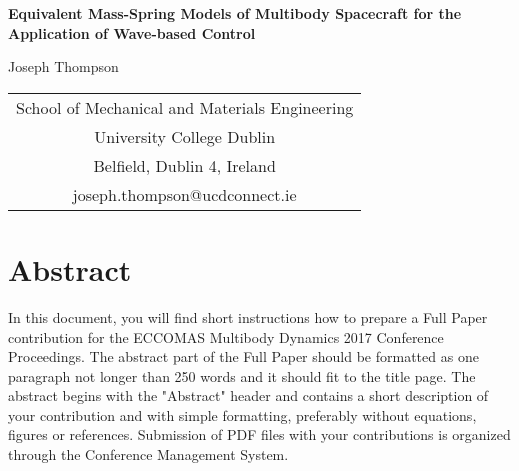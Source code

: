 \documentclass{mbd_fullpaper}
\begin{document}
\newcommand{\heading}[1]{
   {\medskip\hskip5em\bf\large{#1}
   \vskip0.5ex
   }
}
\newcommand{\eqnref}[1]{
  (\ref{#1})
}

\renewcommand{\refname}{\medskip\bf\large References}



\begin{center}
  \Large{\bf
Equivalent Mass-Spring Models of Multibody Spacecraft for the Application of Wave-based Control  }
\end{center}

\begin{center}
\large{
Joseph Thompson
}
\end{center}

{
\begin{center}
 \small
  \begin{tabular}{c}
    School of Mechanical and Materials Engineering \\
    University College Dublin              \\
    Belfield, Dublin 4, Ireland        \\
    joseph.thompson@ucdconnect.ie                        \\
  \end{tabular}
\end{center}
}




\section*{Abstract}

In this document, you will find short instructions how to prepare a Full Paper contribution for the ECCOMAS Multibody Dynamics 2017 Conference Proceedings. The abstract part of the Full Paper should be formatted as one paragraph not longer than 250 words and it should fit to the title page. The abstract begins with the "Abstract" header and contains a short description of your contribution and with simple formatting, preferably without equations, figures or references. Submission of PDF files with your contributions is organized through the Conference Management System.
\end{document}
